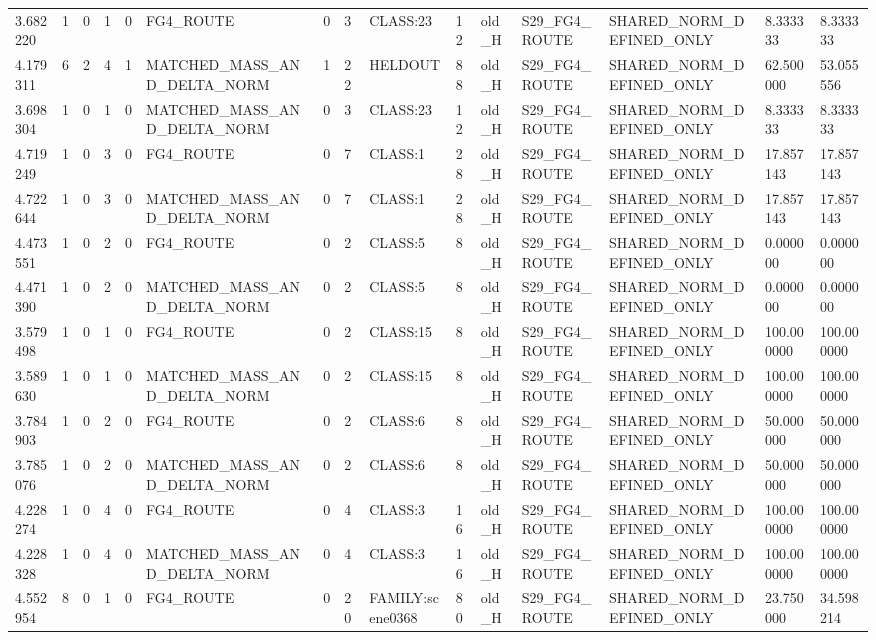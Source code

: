 \begin{tabular}{lllllllllllllll}
3.682220 & 1 & 0 & 1 & 0 & FG4\_ROUTE & 0 & 3 & CLASS:23 & 12 & old\_H & S29\_FG4\_ROUTE & SHARED\_NORM\_DEFINED\_ONLY & 8.333333 & 8.333333 \\
4.179311 & 6 & 2 & 4 & 1 & MATCHED\_MASS\_AND\_DELTA\_NORM & 1 & 22 & HELDOUT & 88 & old\_H & S29\_FG4\_ROUTE & SHARED\_NORM\_DEFINED\_ONLY & 62.500000 & 53.055556 \\
3.698304 & 1 & 0 & 1 & 0 & MATCHED\_MASS\_AND\_DELTA\_NORM & 0 & 3 & CLASS:23 & 12 & old\_H & S29\_FG4\_ROUTE & SHARED\_NORM\_DEFINED\_ONLY & 8.333333 & 8.333333 \\
4.719249 & 1 & 0 & 3 & 0 & FG4\_ROUTE & 0 & 7 & CLASS:1 & 28 & old\_H & S29\_FG4\_ROUTE & SHARED\_NORM\_DEFINED\_ONLY & 17.857143 & 17.857143 \\
4.722644 & 1 & 0 & 3 & 0 & MATCHED\_MASS\_AND\_DELTA\_NORM & 0 & 7 & CLASS:1 & 28 & old\_H & S29\_FG4\_ROUTE & SHARED\_NORM\_DEFINED\_ONLY & 17.857143 & 17.857143 \\
4.473551 & 1 & 0 & 2 & 0 & FG4\_ROUTE & 0 & 2 & CLASS:5 & 8 & old\_H & S29\_FG4\_ROUTE & SHARED\_NORM\_DEFINED\_ONLY & 0.000000 & 0.000000 \\
4.471390 & 1 & 0 & 2 & 0 & MATCHED\_MASS\_AND\_DELTA\_NORM & 0 & 2 & CLASS:5 & 8 & old\_H & S29\_FG4\_ROUTE & SHARED\_NORM\_DEFINED\_ONLY & 0.000000 & 0.000000 \\
3.579498 & 1 & 0 & 1 & 0 & FG4\_ROUTE & 0 & 2 & CLASS:15 & 8 & old\_H & S29\_FG4\_ROUTE & SHARED\_NORM\_DEFINED\_ONLY & 100.000000 & 100.000000 \\
3.589630 & 1 & 0 & 1 & 0 & MATCHED\_MASS\_AND\_DELTA\_NORM & 0 & 2 & CLASS:15 & 8 & old\_H & S29\_FG4\_ROUTE & SHARED\_NORM\_DEFINED\_ONLY & 100.000000 & 100.000000 \\
3.784903 & 1 & 0 & 2 & 0 & FG4\_ROUTE & 0 & 2 & CLASS:6 & 8 & old\_H & S29\_FG4\_ROUTE & SHARED\_NORM\_DEFINED\_ONLY & 50.000000 & 50.000000 \\
3.785076 & 1 & 0 & 2 & 0 & MATCHED\_MASS\_AND\_DELTA\_NORM & 0 & 2 & CLASS:6 & 8 & old\_H & S29\_FG4\_ROUTE & SHARED\_NORM\_DEFINED\_ONLY & 50.000000 & 50.000000 \\
4.228274 & 1 & 0 & 4 & 0 & FG4\_ROUTE & 0 & 4 & CLASS:3 & 16 & old\_H & S29\_FG4\_ROUTE & SHARED\_NORM\_DEFINED\_ONLY & 100.000000 & 100.000000 \\
4.228328 & 1 & 0 & 4 & 0 & MATCHED\_MASS\_AND\_DELTA\_NORM & 0 & 4 & CLASS:3 & 16 & old\_H & S29\_FG4\_ROUTE & SHARED\_NORM\_DEFINED\_ONLY & 100.000000 & 100.000000 \\
4.552954 & 8 & 0 & 1 & 0 & FG4\_ROUTE & 0 & 20 & FAMILY:scene0368 & 80 & old\_H & S29\_FG4\_ROUTE & SHARED\_NORM\_DEFINED\_ONLY & 23.750000 & 34.598214 \\

\end{tabular}
